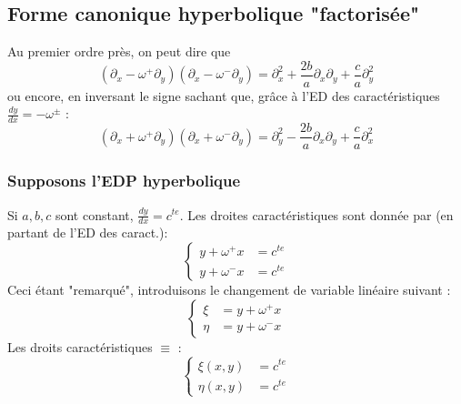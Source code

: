 \documentclass[11pt, a4paper, openany]{book}
\begin{document}
			\subsection{Forme canonique hyperbolique "factorisée"}
			Au premier ordre près, on peut dire que
			\begin{equation}
				(\partial_x - \omega^+ \partial_y)(\partial_x - \omega^- \partial_y) = \partial_x^2 + \frac{2b}{a}\partial_x\partial_y + \frac{c}{a}\partial_y^2
			\end{equation}
			ou encore, en inversant le signe sachant que, grâce à l'ED des caractéristiques $\frac{dy}{dx} = -\omega^\pm$ :
			\begin{equation}
				(\partial_x + \omega^+ \partial_y)(\partial_x + \omega^- \partial_y) = \partial_y^2 - \frac{2b}{a}\partial_x\partial_y + \frac{c}{a}\partial_x^2
			\end{equation}
																
			\subsubsection{Supposons l'EDP hyperbolique}
			Si $a,b,c$ sont constant, $\frac{dy}{dx} = c^{te}$. Les droites caractéristiques sont donnée par (en partant de l'ED des caract.):
			\begin{equation}
				\left\{\begin{array}{ll}
				y+\omega^+x &= c^{te}\\
				y+\omega^-x &= c^{te}
				\end{array}\right.
			\end{equation}
			Ceci étant "remarqué", introduisons le changement de variable linéaire suivant :
			\begin{equation}
				\left\{\begin{array}{ll}
				\xi &= y +\omega^+x\\
				\eta &= y +\omega^-x
				\end{array}\right.
			\end{equation}
			Les droits caractéristiques $\equiv$ :
			\begin{equation}
				\left\{\begin{array}{ll}
				\xi(x,y) &= c^{te}\\
				\eta(x,y) &= c^{te}
				\end{array}\right.
			\end{equation}
			\ \\
																
\end{document}
